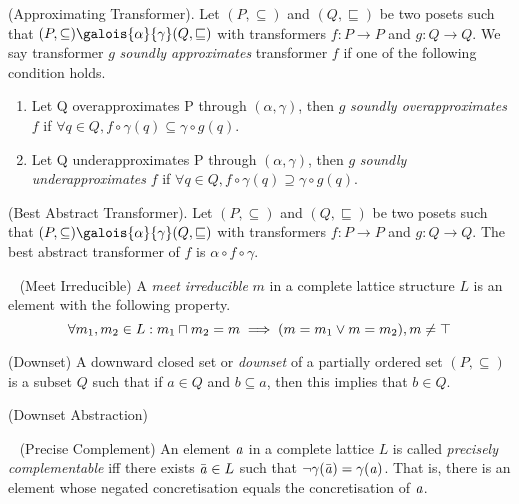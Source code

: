 %
\begin{definition} (Approximating Transformer). 
  Let $(P, \subseteq)$ and $(Q, \sqsubseteq)$ be two posets such that 
  $(P,\subseteq) \galois{\alpha}{\gamma} (Q,\sqsubseteq)$ with transformers 
  $f\colon P \rightarrow P$ and $g \colon Q \rightarrow Q$.  We say transformer 
  $g$ \emph{soundly approximates} transformer $f$ if one of the following condition holds. 
  \begin{enumerate}
    \item Let Q overapproximates P through $(\alpha, \gamma)$, then $g$ \emph{soundly
      overapproximates} $f$ if $\forall q \in Q, f \circ \gamma(q) \subseteq
      \gamma \circ g(q)$. 
    \item Let Q underapproximates P through $(\alpha, \gamma)$, then $g$ \emph{soundly
      underapproximates} $f$ if $\forall q \in Q, f \circ \gamma(q) \supseteq
      \gamma \circ g(q)$. 
  \end{enumerate}
\end{definition}
%  
\begin{definition} (Best Abstract Transformer).
  Let $(P, \subseteq)$ and $(Q, \sqsubseteq)$ be two posets such that 
  $(P,\subseteq) \galois{\alpha}{\gamma} (Q,\sqsubseteq)$ with transformers 
  $f\colon P \rightarrow P$ and $g \colon Q \rightarrow Q$.  The best abstract
  transformer of $f$ is $\alpha \circ f \circ \gamma$. 
\end{definition}  
%
\begin{definition}~\label{meetirrd} (Meet Irreducible)
A \emph{meet irreducible} $m$ in a complete lattice 
structure $L$ is an element with the following property.
\begin{equation}
\forall m_1, m_2 \in L: m_1 \sqcap m_2 = m \implies (m = m_1 \lor m = m_2), m \neq \top  
\end{equation}
\end{definition}
%
\begin{definition} (Downset)
  A downward closed set or \emph{downset} of a partially ordered set $(P, \subseteq)$ is a subset
  $Q$ such that if $a \in Q$ and $b \subseteq a$, then this implies that $b \in
  Q$. 
\end{definition}
%
\begin{definition} (Downset Abstraction)

\end{definition}
%
\begin{definition}~\label{complement} (Precise Complement) 
An element $\mathit{a}$ in a complete lattice $L$ is called 
\emph{precisely complementable} iff there exists 
$\bar{\mathit{a}} \in L$ such that $\neg\gamma(\bar{\mathit{a}})=\gamma(\mathit{a})$.
That is, there is an element whose negated concretisation equals
the concretisation of $\mathit{a}$. 
\end{definition}
